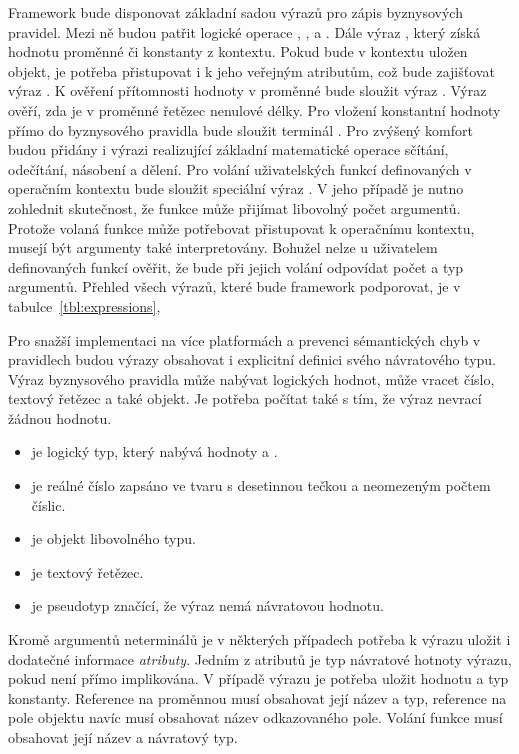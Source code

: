 Framework bude disponovat základní sadou výrazů pro zápis byznysových pravidel.
Mezi ně budou patřit logické operace , ,  a .
Dále výraz , který získá hodnotu proměnné či konstanty z kontextu.
Pokud bude v kontextu uložen objekt, je potřeba přistupovat i k jeho
veřejným atributům, což bude zajišťovat výraz .
K ověření přítomnosti hodnoty v proměnné bude sloužit výraz . Výraz  ověří,
zda je v proměnné řetězec nenulové délky. Pro vložení konstantní hodnoty přímo do byznysového pravidla bude
sloužit terminál . Pro zvýšený komfort budou přidány i výrazi realizující základní matematické operace sčítání, odečítání,
násobení a dělení. Pro volání uživatelských funkcí definovaných v operačním kontextu bude sloužit speciální výraz
. V jeho případě je nutno zohlednit skutečnost, že funkce může přijímat libovolný počet argumentů.
Protože volaná funkce může potřebovat přistupovat k operačnímu kontextu, musejí být argumenty také interpretovány.
Bohužel nelze u uživatelem definovaných funkcí ověřit, že bude při jejich volání odpovídat počet a typ argumentů.
Přehled všech výrazů, které bude framework podporovat, je v tabulce~\ref{tbl:expressions},

Pro snažší implementaci na více platformách a prevenci sémantických chyb v pravidlech budou výrazy
obsahovat i explicitní definici svého návratového typu. Výraz byznysového pravidla může nabývat logických hodnot,
může vracet číslo, textový řetězec a také objekt. Je potřeba počítat také s tím, že výraz nevrací žádnou
hodnotu.

\begin{itemize}
    \item {} je logický typ, který nabývá hodnoty  a .
    \item {} je reálné číslo zapsáno ve tvaru s desetinnou tečkou a neomezeným počtem číslic.
    \item {} je objekt libovolného typu.
    \item {} je textový řetězec.
    \item {} je pseudotyp značící, že výraz nemá návratovou hodnotu.
\end{itemize}

Kromě argumentů neterminálů je v některých případech potřeba k výrazu uložit i dodatečné informace \textendash\xspace
\textit{atributy}. Jedním z atributů je typ návratové hotnoty výrazu, pokud není přímo implikována.
V případě výrazu  je potřeba uložit hodnotu a typ konstanty. Reference na proměnnou
musí obsahovat její název a typ, reference na pole objektu navíc musí obsahovat název odkazovaného pole.
Volání funkce musí obsahovat její název a návratový typ.

